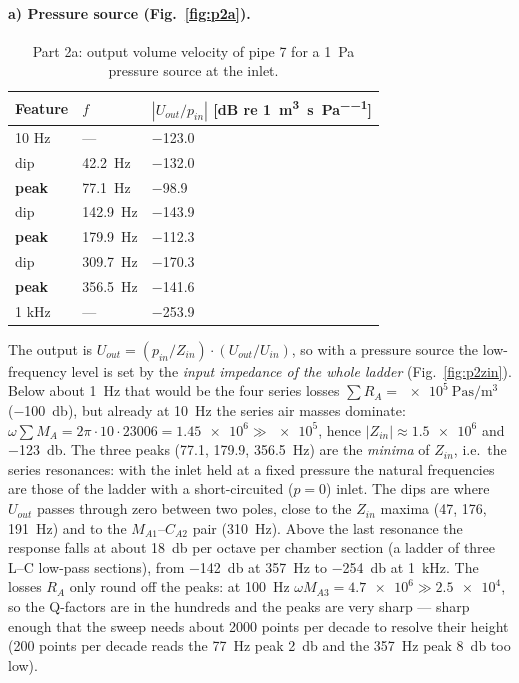 \documentclass[a4paper,11pt]{article}
\begin{document}
\FloatBarrier
\paragraph{a) Pressure source (Fig.~\ref{fig:p2a}).}
\begin{table}[H]\centering\small
\begin{tabular}{@{}lll@{}}\toprule
Feature & $f$ & $|U_{out}/p_{in}|$ [dB re \SI{1}{\cubic\metre\per\second\per\pascal}] \\ \midrule
10 Hz & --- & \num{-123.0} \\
dip & \SI{42.2}{\hertz} & \num{-132.0} \\
\textbf{peak} & \SI{77.1}{\hertz} & \num{-98.9} \\
dip & \SI{142.9}{\hertz} & \num{-143.9} \\
\textbf{peak} & \SI{179.9}{\hertz} & \num{-112.3} \\
dip & \SI{309.7}{\hertz} & \num{-170.3} \\
\textbf{peak} & \SI{356.5}{\hertz} & \num{-141.6} \\
1 kHz & --- & \num{-253.9} \\
\bottomrule\end{tabular}
\caption{Part 2a: output volume velocity of pipe 7 for a \SI{1}{\pascal} pressure source at the inlet.}
\end{table}
The output is $U_{out} = (p_{in}/Z_{in})\cdot(U_{out}/U_{in})$, so with a pressure source the low-frequency level is
set by the \emph{input impedance of the whole ladder} (Fig.~\ref{fig:p2zin}). Below about \SI{1}{\hertz} that would be
the four series losses $\sum R_A = \SI{e5}{\pascal\second\per\cubic\metre}$ (\SI{-100}{\decibel}), but already at
\SI{10}{\hertz} the series air masses dominate: $\omega\sum M_A = 2\pi\cdot 10\cdot 23006 = \num{1.45e6} \gg \num{e5}$,
hence $|Z_{in}|\approx\num{1.5e6}$ and \SI{-123}{\decibel}. The three peaks (77.1, 179.9, \SI{356.5}{\hertz}) are the
\emph{minima} of $Z_{in}$, i.e.\ the series resonances: with the inlet held at a fixed pressure the natural frequencies
are those of the ladder with a short-circuited ($p = 0$) inlet. The dips are where $U_{out}$ passes through zero between
two poles, close to the $Z_{in}$ maxima (47, 176, \SI{191}{\hertz}) and to the $M_{A1}$--$C_{A2}$ pair
(\SI{310}{\hertz}). Above the last resonance the response falls at about \SI{18}{\decibel} per octave per chamber section
(a ladder of three L--C low-pass sections), from \SI{-142}{\decibel} at \SI{357}{\hertz} to \SI{-254}{\decibel} at
\SI{1}{\kilo\hertz}. The losses $R_A$ only round off the peaks: at \SI{100}{\hertz} $\omega M_{A3} = \num{4.7e6}\gg\num{2.5e4}$,
so the Q-factors are in the hundreds and the peaks are very sharp --- sharp enough that the sweep needs about 2000 points per decade to resolve their height (200 points per decade reads the \SI{77}{\hertz} peak \SI{2}{\decibel} and the \SI{357}{\hertz} peak \SI{8}{\decibel} too low).
\end{document}
